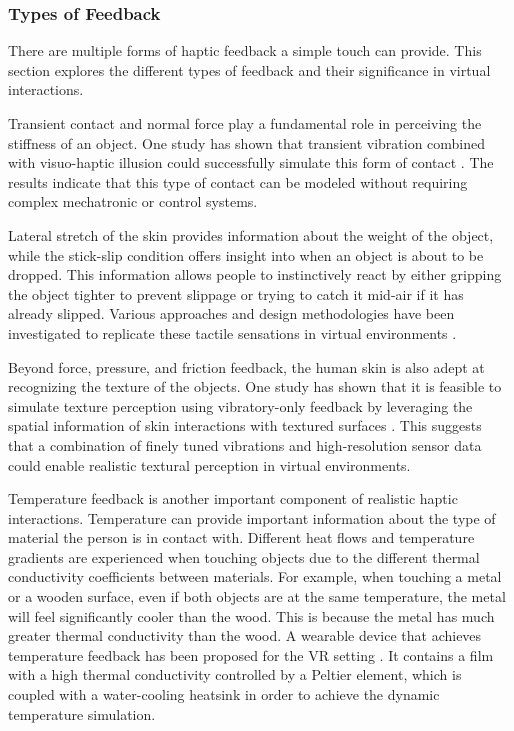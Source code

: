 \subsubsection{Types of Feedback}
There are multiple forms of haptic feedback a simple touch can provide. This section explores the different types of feedback and their significance in virtual interactions.

\bigskip \noindent
Transient contact and normal force play a fundamental role in perceiving the stiffness of an object. One study has shown that transient vibration combined with visuo-haptic illusion could successfully simulate this form of contact \cite{9117062}. The results indicate that this type of contact can be modeled without requiring complex mechatronic or control systems.

\bigskip \noindent
Lateral stretch of the skin provides information about the weight of the object, while the stick-slip condition offers insight into when an object is about to be dropped. This information allows people to instinctively react by either gripping the object tighter to prevent slippage or trying to catch it mid-air if it has already slipped. Various approaches and design methodologies have been investigated to replicate these tactile sensations in virtual environments \cite{10.1145/1278280.1278289}\cite{10.1145/3126594.3126599}.

\bigskip \noindent
Beyond force, pressure, and friction feedback, the human skin is also adept at recognizing the texture of the objects. One study has shown that it is feasible to simulate texture perception using vibratory-only feedback by leveraging the spatial information of skin interactions with textured surfaces \cite{article2615616}. This suggests that a combination of finely tuned vibrations and high-resolution sensor data could enable realistic textural perception in virtual environments.

\bigskip \noindent
Temperature feedback is another important component of realistic haptic interactions. Temperature can provide important information about the type of material the person is in contact with. Different heat flows and temperature gradients are experienced when touching objects due to the different thermal conductivity coefficients between materials. For example, when touching a metal or a wooden surface, even if both objects are at the same temperature, the metal will feel significantly cooler than the wood. This is because the metal has much greater thermal conductivity than the wood. A wearable device that achieves temperature feedback has been proposed for the VR setting \cite{10.1007/978-3-030-58147-3_32}. It contains a film with a high thermal conductivity controlled by a Peltier element, which is coupled with a water-cooling heatsink in order to achieve the dynamic temperature simulation.

